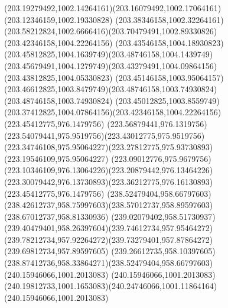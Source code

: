 {{  \curveto(203.19279492,1002.14264161)(203.16079492,1002.17064161)(203.12346159,1002.19330828)
  \curveto(203.38346158,1002.32264161)(203.58212824,1002.6666416)(203.70479491,1002.89330826)
  \moveto(203.42346158,1004.22264156)
  \curveto(203.43546158,1004.18930823)(203.45812825,1004.1639749)(203.48746158,1004.1439749)
  \curveto(203.45679491,1004.1279749)(203.43279491,1004.09864156)(203.43812825,1004.05330823)
  \curveto(203.45146158,1003.95064157)(203.46612825,1003.8479749)(203.48746158,1003.74930824)
  \lineto(203.48746158,1003.74930824)
  \curveto(203.45012825,1003.8559749)(203.37412825,1004.07864156)(203.42346158,1004.22264156)
  \moveto(223.45412775,976.1479756)
  \curveto(223.56879441,976.1319756)(223.54079441,975.9519756)(223.43012775,975.9519756)
  \curveto(223.34746108,975.95064227)(223.27812775,975.93730893)(223.19546109,975.95064227)
  \curveto(223.09012776,975.9679756)(223.10346109,976.13064226)(223.20879442,976.13464226)
  \curveto(223.30079442,976.13730893)(223.36212775,976.16130893)(223.45412775,976.1479756)
  \moveto(238.52479404,958.66797603)
  \curveto(238.42612737,958.75997603)(238.57012737,958.89597603)(238.67012737,958.81330936)
  \curveto(239.02079402,958.51730937)(239.40479401,958.26397604)(239.74612734,957.95464272)
  \curveto(239.78212734,957.92264272)(239.73279401,957.87864272)(239.69812734,957.89597605)
  \curveto(239.26612735,958.10397605)(238.87412736,958.33864271)(238.52479404,958.66797603)
  \moveto(240.15946066,1001.2013083)
  \lineto(240.15946066,1001.2013083)
  \curveto(240.19812733,1001.1653083)(240.24746066,1001.11864164)(240.15946066,1001.2013083)
}
}
